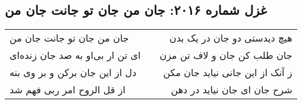 \begin{center}
\section*{غزل شماره ۲۰۱۶: جان من جان تو جانت جان من}
\label{sec:2016}
\begin{longtable}{l p{0.5cm} r}
جان من جان تو جانت جان من
&&
هیچ دیدستی دو جان در یک بدن
\\
ای تن ار بی‌او به صد جان زنده‌ای
&&
جان طلب کن جان و لاف تن مزن
\\
دل از این جان برکن و بر وی بنه
&&
ز آنک از این جانی نیاید جان مکن
\\
از قل الروح امر ربی فهم شد
&&
شرح جان ای جان نیاید در دهن
\\
\end{longtable}
\end{center}
